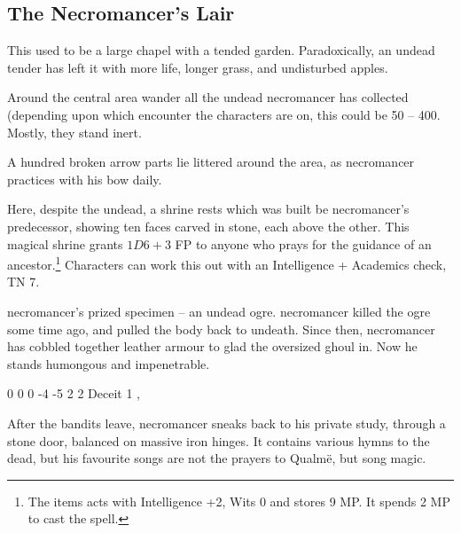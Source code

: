 \begin{multicols}{2}

\setcounter{list}{0}

\subsection{The Necromancer's Lair}\label{necromancers_lair}
This used to be a large chapel with a tended garden.  Paradoxically, an undead tender has left it with more life, longer grass, and undisturbed apples.



Around the central area wander all the undead \gls{necromancer} has collected (depending upon which encounter the characters are on, this could be 50 -- 400.  Mostly, they stand inert.

A hundred broken arrow parts lie littered around the area, as \gls{necromancer} practices with his bow daily.



Here, despite the undead, a shrine rests which was built be \gls{necromancer}'s predecessor, showing ten faces carved in stone, each above the other.  This magical shrine grants $1D6 + 3$ FP to anyone who prays for the guidance of an ancestor.\footnote{The items acts with Intelligence +2, Wits 0 and stores 9 MP. It spends 2 MP to cast the spell.}  Characters can work this out with an Intelligence + Academics check, TN 7.


\Gls{necromancer}'s prized specimen -- an undead ogre.
\Gls{necromancer} killed the ogre some time ago, and pulled the body back to undeath.
Since then, \gls{necromancer} has cobbled together leather armour to glad the oversized ghoul in.
Now he stands humongous and impenetrable.


{0}%
{0}%
{{0}%
{-4}%
{-5}}%
{2}%
{2}%
{Deceit 1}%
{\greatclub, \completeleather}%
{}%


After the bandits leave, \gls{necromancer} sneaks back to his private study, through a stone door, balanced on massive iron hinges.  It contains various hymns to the dead, but his favourite songs are not the prayers to Qualm\"{e}, but song magic.


\end{multicols}
